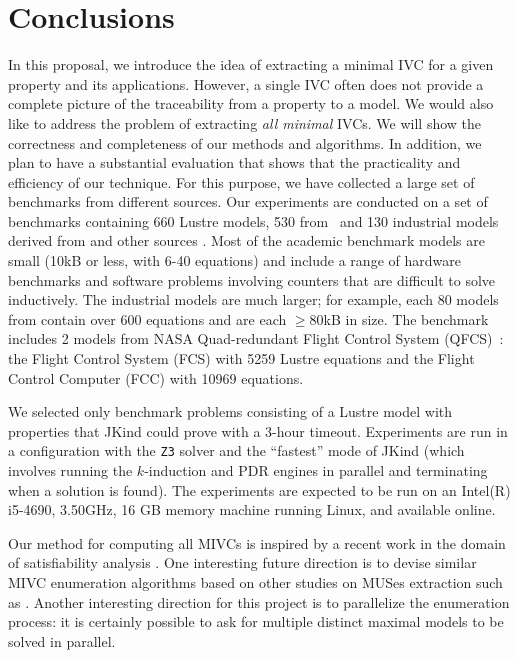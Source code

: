 \chapter{Conclusions}
  
In this proposal, we introduce the idea of extracting a minimal IVC for a given property and its applications.  However, a single IVC often does not provide a complete picture of the traceability from a property to a model.  We would also like to address the problem of extracting {\em all minimal} IVCs. 
We will show
the correctness and completeness of our methods and algorithms.  In addition, we plan to have a substantial evaluation that shows that the practicality and efficiency of our technique. For this purpose, we have collected a large set of benchmarks from different sources. Our experiments are conducted on a set of benchmarks containing 660 Lustre models, 530 from~\cite{Hagen08:FMCAD, piskac2016} and 130 industrial models derived from \cite{hilt2013} and other sources \cite{piskac2016, NFM2015:backes}.  Most of the academic benchmark models are small (10kB or less, with 6-40 equations) and include a range of hardware benchmarks and software problems involving counters that are difficult to solve inductively.
The industrial models are much larger; for example, each 80 models from \cite{hilt2013} contain over 600 equations and are each $\geq$80kB in size. The benchmark includes 2 models from NASA Quad-redundant Flight Control System (QFCS)~\cite{NFM2015:backes}: the Flight Control System (FCS) with 5259 Lustre equations and the Flight Control Computer (FCC) with 10969 equations.

We selected only benchmark problems consisting of a Lustre model with
properties that JKind could prove with a 3-hour timeout.
Experiments are run in a configuration with the \texttt{Z3} solver and the ``fastest'' mode of JKind (which involves running the $k$-induction and PDR engines in parallel and terminating when a solution is found). The experiments are expected to be run on an  Intel(R) i5-4690, 3.50GHz, 16 GB memory machine running Linux, and available online.

Our method for computing all MIVCs is inspired by a recent work in the domain of satisfiability analysis \cite{marco2016fast}. One interesting future direction is to devise similar MIVC enumeration algorithms based on other studies on MUSes extraction such as \cite{nadel2014accelerated}. 
Another interesting direction for this project is to parallelize the enumeration process: it is certainly possible to ask for multiple distinct maximal models to be solved in parallel.

